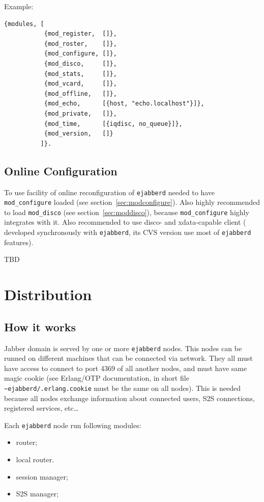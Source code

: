 \documentclass[10pt]{article}
\newcommand{\ejabberd}{\texttt{ejabberd}}
\newcommand{\Jabber}{Jabber}
\newcommand{\modconfigure}{\texttt{mod\_configure}}
\newcommand{\moddisco}{\texttt{mod\_disco}}
\begin{document}
Example:
\begin{verbatim}
{modules, [
           {mod_register,  []},
           {mod_roster,    []},
           {mod_configure, []},
           {mod_disco,     []},
           {mod_stats,     []},
           {mod_vcard,     []},
           {mod_offline,   []},
           {mod_echo,      [{host, "echo.localhost"}]},
           {mod_private,   []},
           {mod_time,      [{iqdisc, no_queue}]},
           {mod_version,   []}
          ]}.
\end{verbatim}


\subsection{Online Configuration}
\label{sec:onlineconfig}

To use facility of online reconfiguration of \ejabberd{} needed to have
\modconfigure{} loaded (see section~\ref{sec:modconfigure}).  Also highly
recommended to load \moddisco{} (see section~\ref{sec:moddisco}), because
\modconfigure{} highly integrates with it.  Also recommended to use disco- and
xdata-capable client
(
developed synchronously with \ejabberd{}, its CVS version use most of
\ejabberd{} features).

TBD

\section{Distribution}
\label{sec:distribution}


\subsection{How it works}
\label{sec:howitworks}

\Jabber{} domain is served by one or more \ejabberd{} nodes.  This nodes can be
runned on different machines that can be connected via network.  They all must
have access to connect to port 4369 of all another nodes, and must have same
magic cookie (see Erlang/OTP documentation, in short file
\texttt{\~{}ejabberd/.erlang.cookie} must be the same on all nodes).  This is
needed because all nodes exchange information about connected users, S2S
connections, registered services, etc\ldots

Each \ejabberd{} node run following modules:
\begin{itemize}
\item router;
\item local router.
\item session manager;
\item S2S manager;
\end{itemize}
\end{document}
